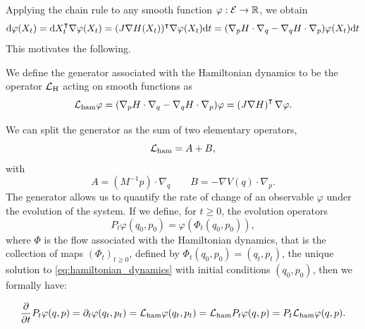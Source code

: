 Applying the chain rule to any smooth function $\varphi: \mathcal E \to \mathbb{R}$, we obtain
        $$ \text d \varphi(X_t)= \text d X_t^{\intercal} \nabla \varphi(X_t)=(J \nabla H(X_t))^\intercal \nabla \varphi(X_t)\mathrm{d}t=(\nabla_p H \cdot \nabla_q - \nabla_q H \cdot \nabla_p)\varphi(X_t)\mathrm{d}t$$
        This motivates the following.
        \begin{definition}
            We define the generator associated with the Hamiltonian dynamics to be the operator $\mathcal{L}_{\text{H}}$ acting on smooth functions as
        \begin{equation}
            \label{eq:hamiltonian_generator}
            \mathcal{L}_{\mathrm{ham}}\varphi=(\nabla_p H \cdot \nabla_q - \nabla_q H \cdot \nabla_p)\varphi=\left(J\nabla H\right)^\intercal \nabla \varphi.
        \end{equation}
    \end{definition}
    We can split the generator as the sum of two elementary operators,
    $$\mathcal{L}_{\rm ham}=A+B,$$
    with
    \begin{equation}
        \label{eq:Lham_splitting}
        A=\left(M^{-1}p\right)\cdot \nabla_q \qquad B=-\nabla V(q)\cdot \nabla_p.
    \end{equation}
    The generator allows us to quantify the rate of change of an observable $\varphi$ under the evolution of the system. If we define, for $t\geq 0$, the evolution operators 
    $$P_t \varphi (q_0,p_0) = \varphi(\Phi_t(q_0,p_0)),$$
where $\Phi$ is the flow associated with the Hamiltonian dynamics, that is the collection of maps $(\Phi_t)_{t\geq 0}$, defined by
    $\Phi_t (q_0,p_0) = (q_t,p_t)$, the unique solution to \eqref{eq:hamiltonian_dynamics} with initial conditions  $(q_0,p_0)$, then we formally have:

    $$ \frac \partial{\partial t} P_t \varphi (q,p)= \partial_t \varphi(q_t,p_t)= \mathcal{L}_{\rm ham} \varphi(q_t,p_t)=\mathcal{L}_{\rm ham} P_t \varphi(q,p)=P_t\mathcal{L}_{\rm ham} \varphi(q,p).$$
    
